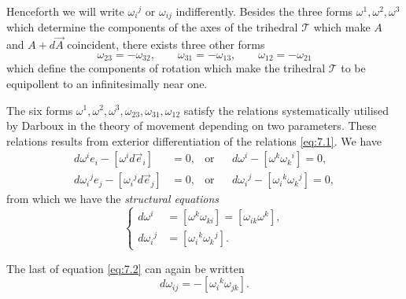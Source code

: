 \documentclass[leqno,11pt]{book}
\numberwithin{equation}{chapter}
\theoremstyle{shape1}
\theoremstyle{shape0}
\theoremstyle{shape2}
\theoremstyle{definition}
\begin{document}
Henceforth we will write $\omega_{i}{}^{j}$ or $\omega_{ij}$ indifferently. Besides the three forms $\omega^{1},\omega^{2},\omega^{3}$ which determine the components of the axes of the trihedral $\mathcal{T}$ which make $A$ and $A+d\vec A$ coincident, there exists three other forms
\[
\omega_{23}=-\omega_{32},\qquad \omega_{31}=-\omega_{13},\qquad \omega_{12}=-\omega_{21}
\]
which define the components of rotation which make the trihedral $\mathcal{T}$ to be equipollent to an infinitesimally near one.

 


\vspace{12pt}\fsec The six forms $\omega^{1}, \omega^{2}, \omega^{3},\omega_{23},\omega_{31},\omega_{12}$ satisfy the relations systematically utilised by Darboux in the theory of movement depending on two parameters. These relations results from exterior differentiation of the relations \eqref{eq:7.1}. We have
\begin{align*}
  d\omega^{i}e_{i}-[\omega^{i}d\vec e_{i}]&=0,&\text{or}&&d\omega^{i}-[\omega^{k}\omega_{k}{}^{i}]=0,\\
  d\omega_{i}{}^{j}e_{j}-[\omega_{i}{}^{j}d\vec e_{j}]&=0,&\text{or}&&d\omega_{i}{}^{j}-[\omega_{i}{}^{k}\omega_{k}{}^{j}]=0,
\end{align*}
from which we have the \emph{structural equations}
\begin{equation}
  \label{eq:7.2}
  \left\{
    \begin{aligned}
      d\omega^{i}&=[\omega^{k}\omega_{ki}]=[\omega_{ik}\omega^{k}],\\
      d\omega_{i}{}^{j}&=[\omega_{i}{}^{k}\omega_{k}{}^{j}].
    \end{aligned}
  \right.
\end{equation}

The last of equation \eqref{eq:7.2} can again be written
\begin{equation}
  \label{eq:7.2'}\tag{2$'$}
  d\omega_{ij}=-[\omega_{i}{}^{k}\omega_{jk}].
\end{equation}
\end{document}
